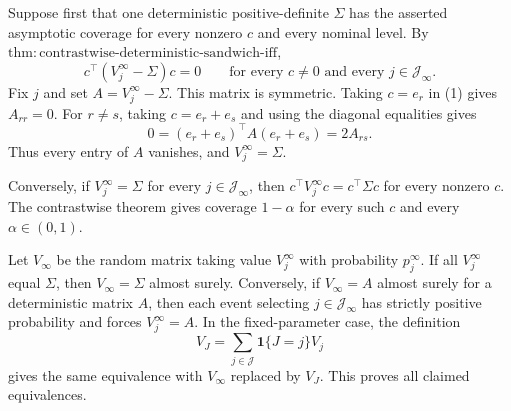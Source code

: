 Suppose first that one deterministic positive-definite \(\Sigma\) has the asserted asymptotic coverage for every nonzero \(c\) and every nominal level. By \(\mathrm{thm:contrastwise\text{-}deterministic\text{-}sandwich\text{-}iff}\),
\[
 c^\top(V_j^\infty-\Sigma)c=0
 \qquad\text{for every }c\ne0\text{ and every }j\in\mathcal J_\infty. \tag{1}
\]
Fix \(j\) and set \(A=V_j^\infty-\Sigma\). This matrix is symmetric. Taking \(c=e_r\) in (1) gives \(A_{rr}=0\). For \(r\ne s\), taking \(c=e_r+e_s\) and using the diagonal equalities gives
\[
 0=(e_r+e_s)^\top A(e_r+e_s)=2A_{rs}. \tag{2}
\]
Thus every entry of \(A\) vanishes, and \(V_j^\infty=\Sigma\).

Conversely, if \(V_j^\infty=\Sigma\) for every \(j\in\mathcal J_\infty\), then \(c^\top V_j^\infty c=c^\top\Sigma c\) for every nonzero \(c\). The contrastwise theorem gives coverage \(1-\alpha\) for every such \(c\) and every \(\alpha\in(0,1)\).

Let \(V_\infty\) be the random matrix taking value \(V_j^\infty\) with probability \(p_j^\infty\). If all \(V_j^\infty\) equal \(\Sigma\), then \(V_\infty=\Sigma\) almost surely. Conversely, if \(V_\infty=A\) almost surely for a deterministic matrix \(A\), then each event selecting \(j\in\mathcal J_\infty\) has strictly positive probability and forces \(V_j^\infty=A\). In the fixed-parameter case, the definition
\[
 V_J=\sum_{j\in\mathcal J}\mathbf 1\{J=j\}V_j
\]
gives the same equivalence with \(V_\infty\) replaced by \(V_J\). This proves all claimed equivalences.